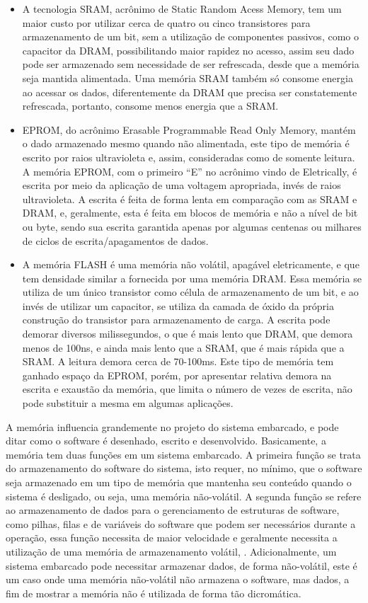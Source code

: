 \begin{itemize}
    \item A tecnologia SRAM, acrônimo de Static Random Acess Memory, tem um maior custo por utilizar cerca de quatro ou cinco transistores para armazenamento de um bit, sem a utilização de componentes passivos, como o capacitor da DRAM, possibilitando maior rapidez no acesso, assim seu dado pode ser armazenado sem necessidade de ser refrescada, desde que a memória seja mantida alimentada. Uma memória SRAM também só consome energia ao acessar os dados, diferentemente da DRAM que precisa ser constatemente refrescada, portanto, consome menos energia que a SRAM. 
    \item EPROM, do acrônimo Erasable Programmable Read Only Memory, mantém o dado armazenado mesmo quando não alimentada, este tipo de memória é escrito por raios ultravioleta e, assim, consideradas como de somente leitura. A memória EPROM, com o primeiro “E” no acrônimo vindo de Eletrically, é escrita por meio da aplicação de uma voltagem apropriada, invés de raios ultravioleta. A escrita é feita de forma lenta em comparação com as SRAM e DRAM, e, geralmente, esta é feita em blocos de memória e não a nível de bit ou byte, sendo sua escrita garantida apenas por algumas centenas ou milhares de ciclos de escrita/apagamentos de dados.
    \item A memória FLASH é uma memória não volátil, apagável eletricamente, e que tem densidade similar a fornecida por uma memória DRAM. Essa memória se utiliza de um único transistor como célula de armazenamento de um bit, e ao invés de utilizar um capacitor, se utiliza da camada de óxido da própria construção do transistor para armazenamento de carga. A escrita pode demorar diversos milissegundos, o que é mais lento que DRAM, que demora menos de 100ns, e ainda mais lento que a SRAM, que é mais rápida que a SRAM. A leitura demora cerca de 70-100ms. Este tipo de memória tem ganhado espaço da EPROM, porém, por apresentar relativa demora na escrita e exaustão da memória, que limita o número de vezes de escrita, não pode substituir a mesma em algumas aplicações.
\end{itemize}

A memória influencia grandemente no projeto do sistema embarcado, e pode ditar como o software é desenhado, escrito e desenvolvido. Basicamente, a memória tem duas funções em um sistema embarcado. A primeira função se trata do armazenamento do software do sistema, isto requer, no mínimo, que o software seja armazenado em um tipo de memória que mantenha seu conteúdo quando o sistema é desligado, ou seja, uma memória não-volátil. A segunda função se refere ao armazenamento de dados para o gerenciamento de estruturas de software, como pilhas, filas e de variáveis do software que podem ser necessários durante a operação, essa função necessita de maior velocidade e geralmente necessita a utilização de uma memória de armazenamento volátil, \cite[p.~8-9]{Steve2003}. Adicionalmente, um sistema embarcado pode necessitar armazenar dados, de forma não-volátil, este é um caso onde uma memória não-volátil não armazena o software, mas dados, a fim de mostrar a memória não é utilizada de forma tão dicromática.

